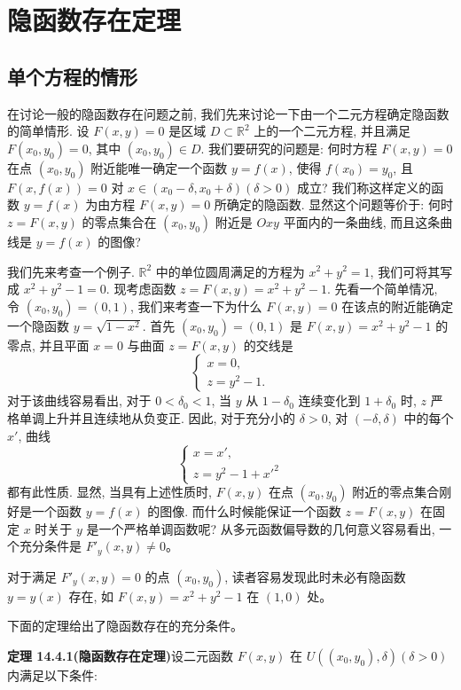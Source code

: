 \documentclass[UTF8, 12pt, fontset=fandol, oneside]{ctexart}
\begin{document}
\section{隐函数存在定理}

\subsection{单个方程的情形}

在讨论一般的隐函数存在问题之前, 我们先来讨论一下由一个二元方程确定隐函数的简单情形. 设 $F(x,y)=0$ 是区域 $D\subset\mathbb R^2$ 上的一个二元方程, 并且满足 $F(x_0,y_0)=0$, 其中 $(x_0,y_0)\in D$. 我们要研究的问题是: 何时方程 $F(x,y)=0$ 在点 $(x_0,y_0)$ 附近能唯一确定一个函数 $y=f(x)$, 使得 $f(x_0)=y_0$, 且 $F(x,f(x))=0$ 对 $x\in(x_0-\delta,x_0+\delta)(\delta>0)$ 成立? 我们称这样定义的函数 $y=f(x)$ 为由方程 $F(x,y)=0$ 所确定的隐函数. 显然这个问题等价于: 何时 $z=F(x,y)$ 的零点集合在 $(x_0,y_0)$ 附近是 $Oxy$ 平面内的一条曲线, 而且这条曲线是 $y=f(x)$ 的图像?

我们先来考查一个例子. $\mathbb R^2$ 中的单位圆周满足的方程为 $x^2+y^2=1$, 我们可将其写成 $x^2+y^2-1=0$. 现考虑函数 $z=F(x,y)=x^2+y^2-1$. 先看一个简单情况, 令 $(x_0,y_0)=(0,1)$, 我们来考查一下为什么 $F(x,y)=0$ 在该点的附近能确定一个隐函数 $y=\sqrt{1-x^2}$. 首先 $(x_0,y_0)=(0,1)$ 是 $F(x,y)=x^2+y^2-1$ 的零点, 并且平面 $x=0$ 与曲面 $z=F(x,y)$ 的交线是
\[
  \begin{cases}
    x=0,\\
    z=y^2-1.
  \end{cases}
\]
对于该曲线容易看出, 对于 $0<\delta_0<1$, 当 $y$ 从 $1-\delta_0$ 连续变化到 $1+\delta_0$ 时, $z$ 严格单调上升并且连续地从负变正. 因此, 对于充分小的 $\delta>0$, 对 $(-\delta,\delta)$ 中的每个 $x'$, 曲线
\[
  \begin{cases}
    x=x',\\
    z=y^2-1+x'^2
  \end{cases}
\]
都有此性质. 显然, 当具有上述性质时, $F(x,y)$ 在点 $(x_0,y_0)$ 附近的零点集合刚好是一个函数 $y=f(x)$ 的图像. 而什么时候能保证一个函数 $z=F(x,y)$ 在固定 $x$ 时关于 $y$ 是一个严格单调函数呢? 从多元函数偏导数的几何意义容易看出, 一个充分条件是 $F'_y(x,y)\ne0$。

对于满足 $F'_y(x,y)=0$ 的点 $(x_0,y_0)$, 读者容易发现此时未必有隐函数 $y=y(x)$ 存在, 如 $F(x,y)=x^2+y^2-1$ 在 $(1,0)$ 处。

下面的定理给出了隐函数存在的充分条件。

\noindent\textbf{定理 14.4.1(隐函数存在定理)}\quad 设二元函数 $F(x,y)$ 在 $U((x_0,y_0),\delta)(\delta>0)$ 内满足以下条件:
\end{document}
